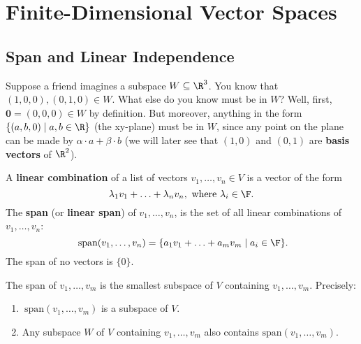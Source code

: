 \documentclass[math0540-lecture-notes.tex]{subfiles}
\begin{document}
\chapter{Finite-Dimensional Vector Spaces}

\section{Span and Linear Independence}
Suppose a friend imagines a subspace $W\subseteq \R^3$. You know that $(1,0,0),(0,1,0)\in W$. What
else do you know must be in $W$? Well, first, $\textbf{0}=(0,0,0)\in W$ by definition. But moreover,
anything in the form $\{ (a,b,0) \mid a,b\in \R \}$ (the xy-plane) must be in $W$, since any point
on the plane can be made by $ \alpha \cdot a + \beta \cdot b$ (we will later see that $(1,0)$ and
$(0,1)$ are \textbf{basis vectors} of $\R^2$).

\begin{definition}{}
  A \textbf{linear combination} of a list of vectors $ v_1,\ldots,v_n\in V$ is a vector of the form \[
      \lambda_1v_1+\ldots+\lambda_nv_n,~\text{where}~ \lambda_i\in \F
    .\]  The \textbf{span} (or \textbf{linear span}) of $ v_1,\ldots,v_n$, is the set of all linear
    combinations of $ v_1,\ldots,v_n$: \[
      ~\text{span}(v_1,\ldots,v_n) = \{ a_1v_1+\ldots+a_mv_m \mid a_i\in \F\}
    .\] 
  The span of no vectors is $\{ 0 \}$.
\end{definition}

\begin{proposition}{}
  The span of $v_1,\ldots,v_m$ is the smallest subspace of $V$ containing $ v_1,\ldots,v_m$.
  Precisely:
  \begin{enumerate}
    \item $~\text{span}(v_1,\ldots,v_m)$ is a subspace of $V$.
    \item Any subspace $W$ of $V$ containing $v_1,\ldots,v_m$ also contains $\text{span}(v_1,\ldots,v_m)$.
  \end{enumerate}
\end{proposition}
\end{document}
